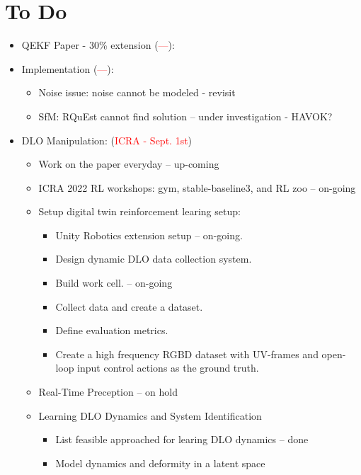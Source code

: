 \documentclass[11pt]{article}
\begin{document}
\section{To Do}
\begin{itemize}
  \item QEKF Paper - 30\% extension (\textcolor{red}{---}):
  \item Implementation (\textcolor{red}{---}):
  \begin{itemize}
      \item Noise issue: noise cannot be modeled - revisit
      \item SfM: RQuEst cannot find solution -- under investigation - HAVOK?
  \end{itemize}
  \item  DLO Manipulation: (\textcolor{red}{ICRA - Sept. 1st})
  \begin{itemize}
      \item Work on the paper everyday -- up-coming
      \item ICRA 2022 RL workshops: gym, stable-baseline3, and RL zoo -- on-going
      \item Setup digital twin reinforcement learing setup:
      \begin{itemize}
        \item Unity Robotics extension setup -- on-going.
        \item Design dynamic DLO data collection system.
        \item Build work cell. -- on-going
        \item Collect data and create a dataset.
        \item Define evaluation metrics.
        \item Create a high frequency RGBD dataset with UV-frames and open-loop input control actions as the ground truth.
      \end{itemize}
      \item Real-Time Preception -- on hold
      \item Learning DLO Dynamics and System Identification
      \begin{itemize}
            \item List feasible approached for learing DLO dynamics -- done
            \item Model dynamics and deformity in a latent space
      \end{itemize}
  \end{itemize}
\end{itemize}
\end{document}
